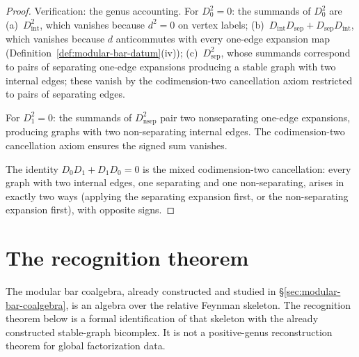 \begin{proof}
Verification: the genus accounting.
For $D_0^2 = 0$: the summands of $D_0^2$ are
(a)~$D_{\mathrm{int}}^2$, which vanishes because $d^2 = 0$ on
vertex labels;
(b)~$D_{\mathrm{int}} D_{\mathrm{sep}} +
D_{\mathrm{sep}} D_{\mathrm{int}}$, which vanishes because
$d$ anticommutes with every one-edge expansion map
(Definition~\ref{def:modular-bar-datum}(iv));
(c)~$D_{\mathrm{sep}}^2$, whose summands correspond to
pairs of separating one-edge expansions producing a stable
graph with two internal edges; these vanish by the
codimension-two cancellation axiom restricted to pairs of
separating edges.

For $D_1^2 = 0$: the summands of $D_{\mathrm{nsep}}^2$ pair
two nonseparating one-edge expansions, producing graphs with
two non-separating internal edges. The codimension-two
cancellation axiom ensures the signed sum vanishes.

The identity $D_0 D_1 + D_1 D_0 = 0$ is the mixed
codimension-two cancellation: every graph with two internal
edges, one separating and one non-separating, arises in
exactly two ways (applying the separating expansion first, or
the non-separating expansion first), with opposite signs.
\end{proof}

\section{The recognition theorem}
\label{sec:rft-recognition}

The modular bar coalgebra, already constructed and studied in
\S\ref{sec:modular-bar-coalgebra}, is an algebra over the
relative Feynman skeleton. The recognition theorem below is a
formal identification of that skeleton with the already constructed
stable-graph bicomplex. It is not a positive-genus reconstruction
theorem for global factorization data.

